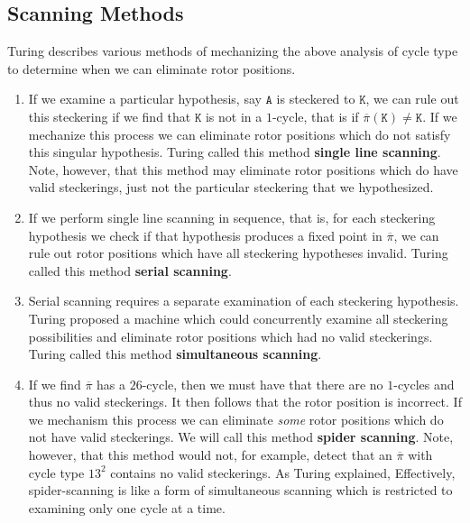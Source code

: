 \subsection{Scanning Methods}
Turing describes various methods of mechanizing the above analysis of
cycle type to determine when we can eliminate rotor positions.
\begin{enumerate}
  \item If we examine a particular hypothesis, say $\texttt{A}$ is steckered
    to $\texttt{K}$, we can rule out this steckering if we find that
    $\texttt{K}$ is
    not in a $1$-cycle, that is if $\overline\pi(\texttt{K}) \ne
    \texttt{K}$. If we
    mechanize this process we can eliminate rotor positions which do
    not satisfy this singular hypothesis. Turing called this method
    \textbf{single line scanning}. Note, however, that this method
    may eliminate rotor
    positions which do have valid steckerings, just not the
    particular steckering that we hypothesized.
  \item If we perform single line scanning in sequence, that is, for
    each steckering hypothesis we check if that hypothesis produces a fixed point in $\overline\pi$, we can rule out rotor positions which
    have all steckering hypotheses invalid. Turing called this method
    \textbf{serial scanning}.
  \item Serial scanning requires a separate examination of each
    steckering hypothesis. Turing proposed a machine which could concurrently
    examine all steckering possibilities and eliminate rotor positions
    which had no valid steckerings. Turing called this method
    \textbf{simultaneous scanning}.
  \item If we find $\overline\pi$ has a $26$-cycle, then we must
    have that there are no $1$-cycles and thus no valid steckerings.
    It then follows that the rotor position is incorrect.
    If we mechanism this process we can eliminate \emph{some} rotor
    positions which do not have valid steckerings. We will call this
    method \textbf{spider scanning}. Note, however, that this method
    would not, for example, detect that an $\overline\pi$ with cycle
    type ${13}^2$ contains no
    valid steckerings. As Turing explained,
     Effectively, spider-scanning is like a form of
    simultaneous scanning which is restricted
    to examining only one cycle at a time.
\end{enumerate}
